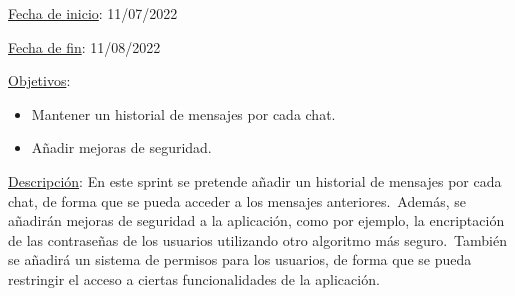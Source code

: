 
\underline{Fecha de inicio}: 11/07/2022

\underline{Fecha de fin}: 11/08/2022

\underline{Objetivos}:
\begin{itemize}
	\item Mantener un historial de mensajes por cada chat.
	\item Añadir mejoras de seguridad.
\end{itemize}

\underline{Descripción}:
En este sprint se pretende añadir un historial de mensajes por cada chat, de forma que se pueda acceder a los
mensajes anteriores.\ Además, se añadirán mejoras de seguridad a la aplicación, como por ejemplo, la
encriptación de las contraseñas de los usuarios utilizando otro algoritmo más seguro.\ También se añadirá un sistema
de permisos para los usuarios, de forma que se pueda restringir el acceso a ciertas funcionalidades de la aplicación.


